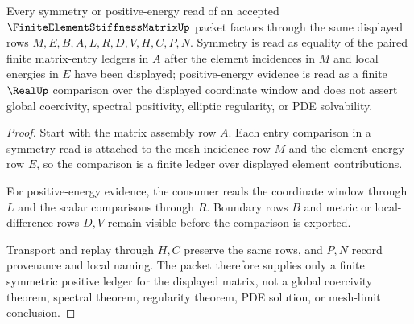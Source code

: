 \begin{theorem}
\label{thm:finite-element-stiffness-matrix-symmetric-positive-ledger}
Every symmetry or positive-energy read of an accepted $\FiniteElementStiffnessMatrixUp$ packet factors through the same displayed rows $M,E,B,A,L,R,D,V,H,C,P,N$. Symmetry is read as equality of the paired finite matrix-entry ledgers in $A$ after the element incidences in $M$ and local energies in $E$ have been displayed; positive-energy evidence is read as a finite $\RealUp$ comparison over the displayed coordinate window and does not assert global coercivity, spectral positivity, elliptic regularity, or PDE solvability.
\end{theorem}
\begin{proof}
Start with the matrix assembly row $A$. Each entry comparison in a symmetry read is attached to the mesh incidence row $M$ and the element-energy row $E$, so the comparison is a finite ledger over displayed element contributions.

For positive-energy evidence, the consumer reads the coordinate window through $L$ and the scalar comparisons through $R$. Boundary rows $B$ and metric or local-difference rows $D,V$ remain visible before the comparison is exported.

Transport and replay through $H,C$ preserve the same rows, and $P,N$ record provenance and local naming. The packet therefore supplies only a finite symmetric positive ledger for the displayed matrix, not a global coercivity theorem, spectral theorem, regularity theorem, PDE solution, or mesh-limit conclusion.
\end{proof}

